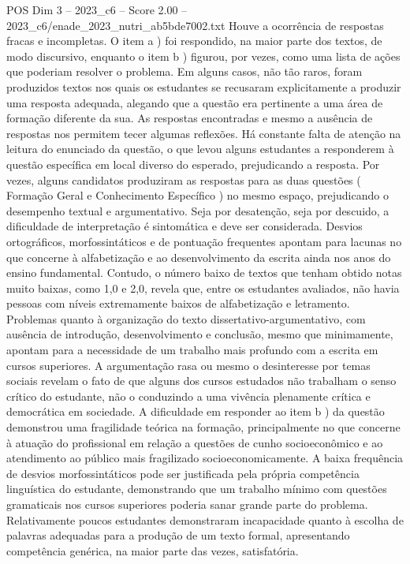 \begin{textsample}{POS Dim 3 – 2023\_c6 – Score 2.00 – 2023\_c6/enade\_2023\_nutri\_ab5bde7002.txt}
Houve a ocorrência de respostas fracas e incompletas.
O item a ) foi respondido, na maior parte dos textos, de modo discursivo, enquanto o item b ) figurou, por vezes, como uma lista de ações que poderiam resolver o problema.
Em alguns casos, não tão raros, foram produzidos textos nos quais os estudantes se recusaram explicitamente a produzir uma resposta adequada, alegando que a questão era pertinente a uma área de formação diferente da sua.
As respostas encontradas e mesmo a ausência de respostas nos permitem tecer algumas reflexões.
Há constante falta de atenção na leitura do enunciado da questão, o que levou alguns estudantes a responderem à questão específica em local diverso do esperado, prejudicando a resposta.
Por vezes, alguns candidatos produziram as respostas para as duas questões ( Formação Geral e Conhecimento Específico ) no mesmo espaço, prejudicando o desempenho textual e argumentativo.
Seja por desatenção, seja por descuido, a dificuldade de interpretação é sintomática e deve ser considerada.
Desvios ortográficos, morfossintáticos e de pontuação frequentes apontam para lacunas no que concerne à alfabetização e ao desenvolvimento da escrita ainda nos anos do ensino fundamental.
Contudo, o número baixo de textos que tenham obtido notas muito baixas, como 1,0 e 2,0, revela que, entre os estudantes avaliados, não havia pessoas com níveis extremamente baixos de alfabetização e letramento.
Problemas quanto à organização do texto dissertativo-argumentativo, com ausência de introdução, desenvolvimento e conclusão, mesmo que minimamente, apontam para a necessidade de um trabalho mais profundo com a escrita em cursos superiores.
A argumentação rasa ou mesmo o desinteresse por temas sociais revelam o fato de que alguns dos cursos estudados não trabalham o senso crítico do estudante, não o conduzindo a uma vivência plenamente crítica e democrática em sociedade.
A dificuldade em responder ao item b ) da questão demonstrou uma fragilidade teórica na formação, principalmente no que concerne à atuação do profissional em relação a questões de cunho socioeconômico e ao atendimento ao público mais fragilizado socioeconomicamente.
A baixa frequência de desvios morfossintáticos pode ser justificada pela própria competência linguística do estudante, demonstrando que um trabalho mínimo com questões gramaticais nos cursos superiores poderia sanar grande parte do problema.
Relativamente poucos estudantes demonstraram incapacidade quanto à escolha de palavras adequadas para a produção de um texto formal, apresentando competência genérica, na maior parte das vezes, satisfatória.

\end{textsample}
